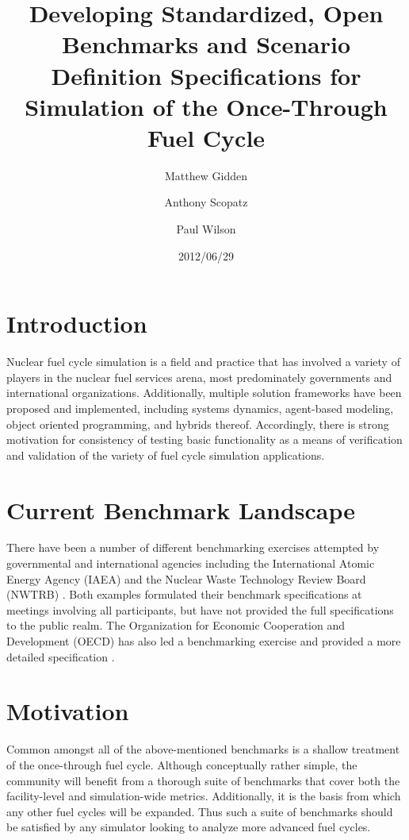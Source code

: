 \documentclass{anstrans}
\title{Developing Standardized, Open Benchmarks and Scenario 
Definition Specifications for Simulation of the Once-Through Fuel 
Cycle}
\author[*]{Matthew Gidden}
\author[$\dag$]{Anthony Scopatz}
\author[*]{Paul Wilson}
\affil[*]{Department of Nuclear Engineering \& Engineering Physics, 
University of Wisconsin - Madison, Madison, WI, 53703}
\affil[$\dag$]{The Flash Center for Computational Science, University 
of Chicago, Chicago, IL, 60637}
\date{2012/06/29}
\begin{document}
\section{Introduction}
Nuclear fuel cycle simulation is a field and practice that has 
involved a variety of players in the nuclear fuel services arena, most
predominately governments and international organizations. 
Additionally, multiple solution frameworks have been proposed and 
implemented, including systems dynamics, agent-based modeling, object 
oriented programming, and hybrids thereof. Accordingly, there is 
strong motivation for consistency of testing basic functionality as a
means of verification and validation of the variety of fuel cycle
simulation applications.

\section{Current Benchmark Landscape}
There have been a number of different benchmarking exercises attempted
by governmental and international agencies including the International
Atomic Energy Agency (IAEA) \cite{_international_2011} and the
Nuclear Waste Technology Review Board (NWTRB) \cite{_nuclear_2011}.
Both examples formulated their benchmark specifications at meetings
involving all participants, but have not provided the full 
specifications to the public realm. The Organization for Economic 
Cooperation and Development (OECD) has also led a benchmarking 
exercise \cite{boucher_benchmark_2012} and provided a more detailed
specification \cite{boucher_specification_2008}.

\section{Motivation}
Common amongst all of the above-mentioned benchmarks is a shallow
treatment of the once-through fuel cycle. Although conceptually 
rather simple, the community will benefit from a thorough suite of 
benchmarks that cover both the facility-level and simulation-wide 
metrics. Additionally, it is the basis from which any other fuel 
cycles will be expanded.  Thus such a suite of benchmarks should be 
satisfied by any simulator looking to analyze more advanced fuel 
cycles.
\end{document}
